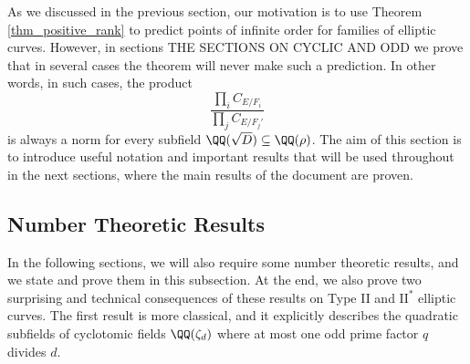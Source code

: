 As we discussed in the previous section, our motivation is to use Theorem \ref*{thm_positive_rank} to predict points of infinite order for families of elliptic curves. However, in sections {\color{red} THE SECTIONS ON CYCLIC AND ODD} we prove that in several cases the theorem will never make such a prediction. In other words, in such cases, the product
\begin{equation}\label{eqn_localprod}
    \frac{\prod_i C_{E/F_i}}{\prod_j C_{E/F_j'}}
\end{equation}
is always a norm for every subfield $\QQ(\sqrt{D})\subseteq\QQ(\rho)$. The aim of this section is to introduce useful notation and important results that will be used throughout in the next sections, where the main results of the document are proven. 



\subsection{Number Theoretic Results}

In the following sections, we will also require some number theoretic results, and we state and prove them in this subsection. At the end, we also prove two surprising and technical consequences of these results on Type II and $\mathrm{II^*}$ elliptic curves. The first result is more classical, and it explicitly describes the quadratic subfields of cyclotomic fields $\QQ(\zeta_d)$ where at most one odd prime factor $q$ divides $d$.

